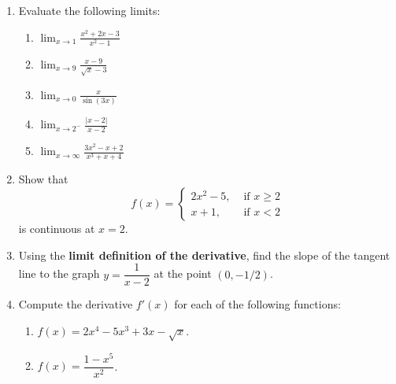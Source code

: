 \documentclass[12pt]{article}
\newcommand{\points}[1]{\marginpar{\hspace{24pt}[#1]}}
\newcommand{\di}{\displaystyle}
\newcommand{\abs}[1]{\lvert #1\rvert}
\begin{document}
 \begin{enumerate}
 \item  Evaluate the following limits:
 \begin{enumerate}
 \item $\di \lim_{x\to 1}\frac{x^2+2x-3}{x^2-1}$ \points{2}
 
 \vspace{1.25in}
 
 \item $\di \lim_{x\to 9}\frac{x-9}{\sqrt{x}-3}$ \points{2}
 
 \vspace{1.25in}
 
 \item $\di \lim_{x\to 0}\frac{x}{\sin(3x)}$ \points{2}
 
 \vspace{1.5in}
 
 \item $\di \lim_{x\to 2^-}\frac{\abs{x-2}}{x-2}$ \points{2}
 
 \vspace{1.5in}
 
 \item $\di\lim_{x\to \infty}\frac{3x^2-x+2}{x^3+x+4}$ \points{2}
 \end{enumerate}
 \newpage
 
 \item Show that \points{5}
 \[
 f(x) = \begin{cases} 2x^2-5, & \text{ if } x\geq 2\\ x+1, & \text{ if } x<2\end{cases}
 \]
 is continuous at $x=2$.
 
 \vspace{3.25in}
 
 \item Using the \textbf{limit definition of the derivative}, find the slope of the tangent line to the graph $y=\dfrac{1}{x-2}$ at the point $(0,-1/2)$. \points{5}
 
 \newpage
 
 \item Compute the derivative $f'(x)$ for each of the following functions:
 \begin{enumerate}
 \item $f(x) = 2x^4-5x^3+3x-\sqrt{x}$. \points{2}
 
 \vspace{1.25in}
 
 \item $f(x) = \dfrac{1-x^5}{x^2}$. \points{2}
 

\end{enumerate}
\end{enumerate}
\end{document}
